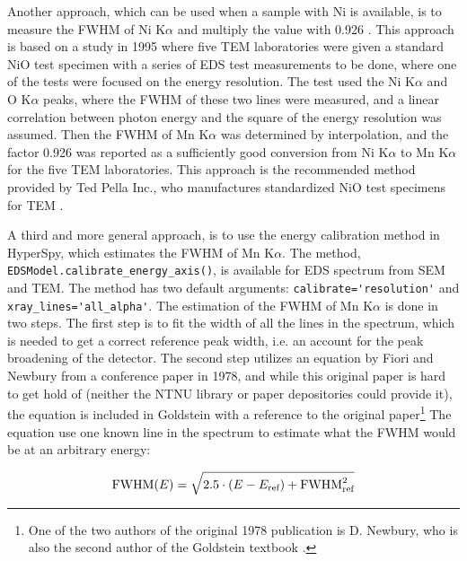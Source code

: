 Another approach, which can be used when a sample with Ni is available, is to measure the FWHM of Ni K$\alpha$ and multiply the value with 0.926 \cite{bennett_egerton_1995}.
This approach is based on a study in 1995 \cite{bennett_egerton_1995} where five TEM laboratories were given a standard NiO test specimen with a series of EDS test measurements to be done, where one of the tests were focused on the energy resolution.
The test used the Ni K$\alpha$ and O K$\alpha$ peaks, where the FWHM of these two lines were measured, and a linear correlation between photon energy and the square of the energy resolution was assumed.
Then the FWHM of Mn K$\alpha$ was determined by interpolation, and the factor 0.926 was reported as a sufficiently good conversion from Ni K$\alpha$ to Mn K$\alpha$ for the five TEM laboratories.
This approach is the recommended method provided by Ted Pella Inc., who manufactures standardized NiO test specimens for TEM \cite{egerton_nio_characterization_1994,ted_pella_nio_tem_2019}.


A third and more general approach, is to use the energy calibration method in HyperSpy, which estimates the FWHM of Mn K$\alpha$.
The method, \verb|EDSModel.calibrate_energy_axis()|, is available for EDS spectrum from SEM and TEM.
The method has two default arguments: \verb|calibrate='resolution'| and \verb|xray_lines='all_alpha'|.
The estimation of the FWHM of Mn K$\alpha$ is done in two steps.
The first step is to fit the width of all the lines in the spectrum, which is needed to get a correct reference peak width, i.e. an account for the peak broadening of the detector.
The second step utilizes an equation by Fiori and Newbury from a conference paper in 1978, and while this original paper is hard to get hold of (neither the NTNU library or paper depositories could provide it), the equation is included in Goldstein \cite[Ch. 16.1.1]{goldstein_scanning_2018} with a reference to the original paper\footnote{One of the two authors of the original 1978 publication is D. Newbury, who is also the second author of the Goldstein textbook \cite{goldstein_scanning_2018}.}
The equation use one known line in the spectrum to estimate what the FWHM would be at an arbitrary energy:

\begin{equation}
    \label{eq:estimateFWHM}
    \textnormal{FWHM}(E) =  \sqrt{2.5 \cdot (E - E_\textnormal{ref}) + \textnormal{FWHM}^2_{\textnormal{ref}}}
\end{equation}

